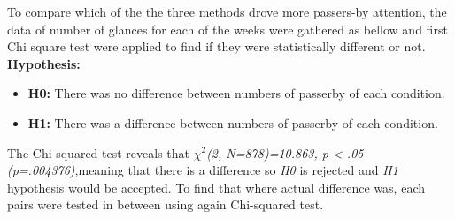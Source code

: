 To compare which of the the three methods drove more passers-by attention, the data of number of glances for each of the weeks were gathered as bellow and first Chi square test were applied to find if they were statistically different or not.\\

\textbf{Hypothesis: }
\begin{itemize}
\item \textbf{H0:} There was no difference between numbers of passerby of each condition.
\item \textbf{H1:} There was a difference between numbers of passerby of each condition.
\end{itemize}

\begin{table}[H]
\caption{Cross tabulation for each week attention level }
\label{tab:crosstabulationweeks}
\centering
{}
\end{table}


The Chi-squared test reveals that ${\chi}^2$\emph{(2, N=878)=10.863, p < .05 (p=.004376)},meaning that there is a difference so \emph{H0} is rejected and \emph{H1} hypothesis would be accepted.
To find that where actual difference was, each pairs were tested in between using again Chi-squared test.

